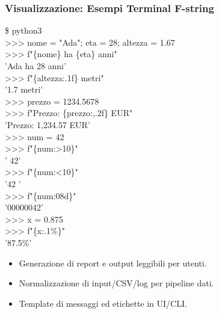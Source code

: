 \subsubsection{Visualizzazione: Esempi Terminal F-string}
\begin{center}
\begin{tcolorbox}[title={Esempi Terminal: Formattazione F-string}, colback=black!5, colframe=blue!60, width=0.95\textwidth, fontupper=\ttfamily\small]
\textcolor{green!60!black}{\$ python3}\\
\textcolor{blue!80}{>>> nome = "Ada"; eta = 28; altezza = 1.67}\\
\textcolor{blue!80}{>>> f"\{nome\} ha \{eta\} anni"}\\
'Ada ha 28 anni'\\[4pt]
\textcolor{blue!80}{>>> f"\{altezza:.1f\} metri"}\\
'1.7 metri'\\[4pt]
\textcolor{blue!80}{>>> prezzo = 1234.5678}\\
\textcolor{blue!80}{>>> f"Prezzo: \{prezzo:,.2f\} EUR"}\\
'Prezzo: 1,234.57 EUR'\\[4pt]
\textcolor{blue!80}{>>> num = 42}\\
\textcolor{blue!80}{>>> f"\{num:>10\}"}\\
'        42'\\[4pt]
\textcolor{blue!80}{>>> f"\{num:<10\}"}\\
'42        '\\[4pt]
\textcolor{blue!80}{>>> f"\{num:08d\}"}\\
'00000042'\\[4pt]
\textcolor{blue!80}{>>> x = 0.875}\\
\textcolor{blue!80}{>>> f"\{x:.1\%\}"}\\
'87.5\%'
\end{tcolorbox}
\end{center}

\begin{tcolorbox}[title=Casi d'uso]
\begin{itemize}
  \item Generazione di report e output leggibili per utenti.
  \item Normalizzazione di input/CSV/log per pipeline dati.
  \item Template di messaggi ed etichette in UI/CLI.
\end{itemize}
\end{tcolorbox}

